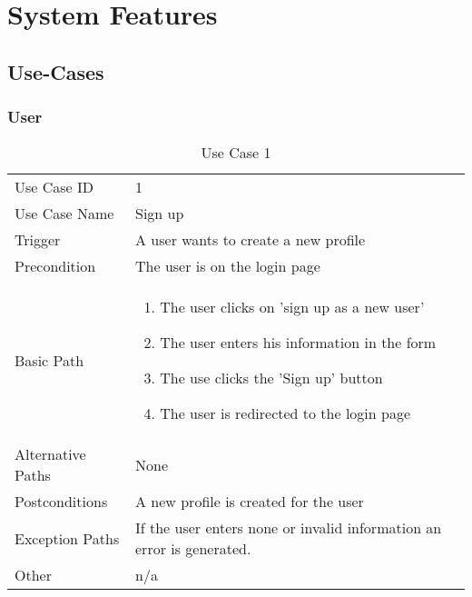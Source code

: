 \section{System Features}
\subsection{Use-Cases}
\subsubsection{User}

\begin{table}[H]
\centering
\label{table-use-case-1}
\begin{tabular}{|p{3cm}|p{10cm}}
Use Case ID       & 1                                                           
\\
Use Case Name     & Sign up                                                         
\\
Trigger           & A user wants to create a new profile
\\
Precondition      & The user is on the login page                                                
\\
Basic Path        & \begin{enumerate}
\item The user clicks on 'sign up as a new user'
\item The user enters his information in the form
\item The use clicks the 'Sign up' button
\item The user is redirected to the login page
\end{enumerate} 
     \\
Alternative Paths & None                     
\\
Postconditions    & A new profile is created for the user
\\
Exception Paths   & If the user enters none or invalid information an error is
generated. 
\\
Other             & n/a                                                                                                                                                                                                        
\end{tabular}
\caption{Use Case 1}
\end{table}

